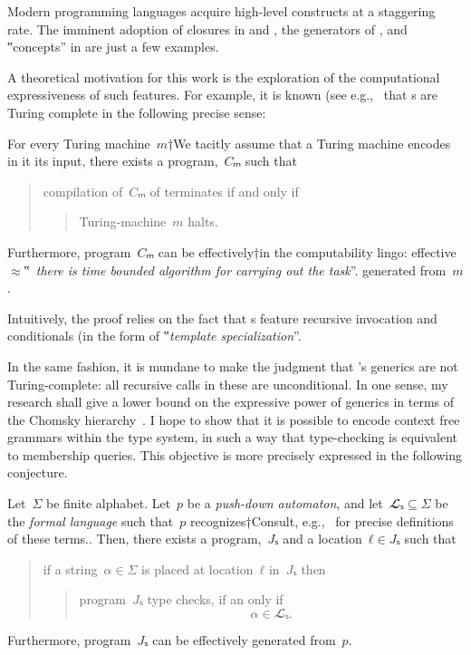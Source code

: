 Modern programming languages acquire high-level constructs
  at a staggering rate.
The imminent adoption of closures in \Java and \CC,
  the generators of \CSharp, and ‟concepts” in
  \CC are just a few examples.

A theoretical motivation for this work
  is the exploration of the computational
  expressiveness of such features.
For example, it is known (see e.g.,~\cite{Gutterman:MSc} that
  s are Turing complete in the following precise sense:

\begin{Theorem}
  \label{Theorem:Gutterman}
  For every Turing machine~$m$†{We tacitly assume that a Turing machine
    encodes in it its input}, there exists a \CC program,~$Cₘ$ such that
  \begin{quote}
    compilation of~$Cₘ$ of terminates if and only if
    \begin{quote}
      Turing-machine~$m$ halts.
    \end{quote}
  \end{quote}
  Furthermore, program~$Cₘ$ can be effectively†{in the computability lingo:
    effective~$≈$‟~\emph{there is time
  bounded algorithm for carrying out the task}”.} generated from~$m$.
\end{Theorem}

Intuitively, the proof relies on the fact that s
  feature recursive invocation and conditionals (in the form of
  ‟\emph{template specialization}”.

In the same fashion, it is mundane to make the judgment that
  \Java's generics are not Turing-complete: all recursive calls
  in these are unconditional.
In one sense, my research shall give a lower bound on the
  expressive power of \Java generics in terms of the Chomsky hierarchy~\cite{Chomsky}.
I hope to show that it is possible to encode context free grammars within the \Java type system,
  in such a way that type-checking is equivalent to membership queries.
This objective is more precisely expressed in the following conjecture.

\begin{Conjecture}
\label{Conjecture:Gil:Levy}
Let~$Σ$ be finite alphabet.
Let~$p$ be a \emph{push-down automaton}, and let~$𝓛ₛ⊆Σ$ be
the \emph{formal language} such that~$p$
recognizes†{Consult, e.g.,~\cite{Automatim} for precise definitions of these terms.}.
Then, there exists a \Java program,~$Jₛ$ and a location~$ℓ∈Jₛ$
such that
\begin{quote}
  if a string~$α∈Σ$ is
  placed at location~$ℓ$ in~$Jₛ$ then
  \begin{quote}
    program~$Jₛ$ type checks, if an only if
    \[
      α∈𝓛ₛ.
    \]
  \end{quote}
\end{quote}
Furthermore, program~$Jₛ$ can be effectively generated from~$p$.
\end{Conjecture}


